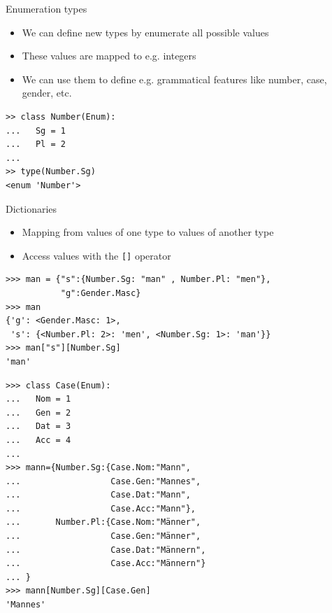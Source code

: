 \documentclass{beamer}
\begin{document}
\begin{frame}[fragile]{Enumeration types}
  \begin{itemize}
  \item We can define new types by enumerate all possible values
  \item These values are mapped to e.g. integers
  \item We can use them to define e.g. grammatical features like number, case, gender, etc.
  \end{itemize}
\begin{verbatim}
>> class Number(Enum):
...   Sg = 1
...   Pl = 2
... 
>> type(Number.Sg)
<enum 'Number'>
\end{verbatim}
\end{frame}
\begin{frame}[fragile]{Dictionaries}
  \begin{itemize}
  \item Mapping from values of one type to values of another type
  \item Access values with the \texttt{[]} operator
  \end{itemize}
\begin{verbatim}
>>> man = {"s":{Number.Sg: "man" , Number.Pl: "men"}, 
           "g":Gender.Masc}
>>> man
{'g': <Gender.Masc: 1>, 
 's': {<Number.Pl: 2>: 'men', <Number.Sg: 1>: 'man'}}
>>> man["s"][Number.Sg]
'man'
\end{verbatim}
\end{frame}

\begin{frame}[fragile]
\begin{verbatim}
>>> class Case(Enum):
...   Nom = 1
...   Gen = 2
...   Dat = 3
...   Acc = 4
... 
>>> mann={Number.Sg:{Case.Nom:"Mann", 
...                  Case.Gen:"Mannes", 
...                  Case.Dat:"Mann", 
...                  Case.Acc:"Mann"},
...       Number.Pl:{Case.Nom:"Männer", 
...                  Case.Gen:"Männer", 
...                  Case.Dat:"Männern", 
...                  Case.Acc:"Männern"}
... }
>>> mann[Number.Sg][Case.Gen]
'Mannes'
\end{verbatim}
\end{frame}
\end{document}
